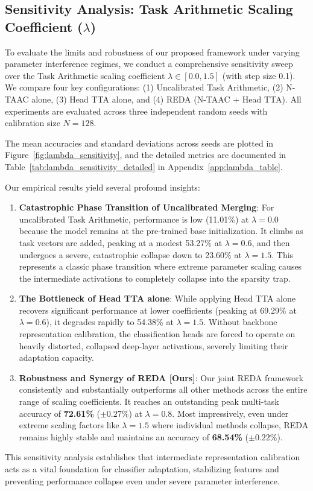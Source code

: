 \documentclass{article}
\theoremstyle{plain}
\theoremstyle{definition}
\theoremstyle{remark}
\begin{document}
\subsection{Sensitivity Analysis: Task Arithmetic Scaling Coefficient ($\lambda$)}
To evaluate the limits and robustness of our proposed framework under varying parameter interference regimes, we conduct a comprehensive sensitivity sweep over the Task Arithmetic scaling coefficient $\lambda \in [0.0, 1.5]$ (with step size 0.1). We compare four key configurations: (1) Uncalibrated Task Arithmetic, (2) N-TAAC alone, (3) Head TTA alone, and (4) REDA (N-TAAC + Head TTA). All experiments are evaluated across three independent random seeds with calibration size $N=128$.

The mean accuracies and standard deviations across seeds are plotted in Figure~\ref{fig:lambda_sensitivity}, and the detailed metrics are documented in Table~\ref{tab:lambda_sensitivity_detailed} in Appendix~\ref{app:lambda_table}.

Our empirical results yield several profound insights:
\begin{enumerate}
    \item \textbf{Catastrophic Phase Transition of Uncalibrated Merging}: For uncalibrated Task Arithmetic, performance is low (11.01\%) at $\lambda=0.0$ because the model remains at the pre-trained base initialization. It climbs as task vectors are added, peaking at a modest 53.27\% at $\lambda=0.6$, and then undergoes a severe, catastrophic collapse down to 23.60\% at $\lambda=1.5$. This represents a classic phase transition where extreme parameter scaling causes the intermediate activations to completely collapse into the sparsity trap.
    \item \textbf{The Bottleneck of Head TTA alone}: While applying Head TTA alone recovers significant performance at lower coefficients (peaking at 69.29\% at $\lambda=0.6$), it degrades rapidly to 54.38\% at $\lambda=1.5$. Without backbone representation calibration, the classification heads are forced to operate on heavily distorted, collapsed deep-layer activations, severely limiting their adaptation capacity.
    \item \textbf{Robustness and Synergy of REDA [Ours]}: Our joint REDA framework consistently and substantially outperforms all other methods across the entire range of scaling coefficients. It reaches an outstanding peak multi-task accuracy of \textbf{72.61\%} ($\pm 0.27\%$) at $\lambda=0.8$. Most impressively, even under extreme scaling factors like $\lambda=1.5$ where individual methods collapse, REDA remains highly stable and maintains an accuracy of \textbf{68.54\%} ($\pm 0.22\%$). 
\end{enumerate}
This sensitivity analysis establishes that intermediate representation calibration acts as a vital foundation for classifier adaptation, stabilizing features and preventing performance collapse even under severe parameter interference.
\end{document}
